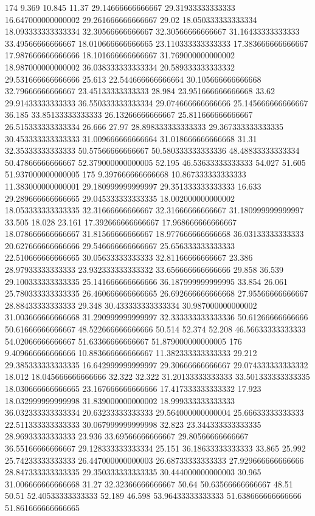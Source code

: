 174 9.369 10.845 11.37 29.14666666666667 29.31933333333333 16.647000000000002 29.261666666666667 29.02 18.050333333333334 18.093333333333334 32.30566666666667 32.30566666666667 31.16433333333333 33.49566666666667 18.010666666666665 23.110333333333333 17.383666666666667 17.987666666666666 18.101666666666667 31.769000000000002 18.987000000000002 36.038333333333334 20.589333333333332 29.531666666666666 25.613 22.544666666666664 30.105666666666668 32.79666666666667 23.45133333333333 28.984 23.951666666666668 33.62 29.91433333333333 36.550333333333334 29.074666666666666 25.145666666666667 36.185 33.85133333333333 26.13266666666667 25.811666666666667 26.515333333333334 26.666 27.97 28.898333333333333 29.367333333333335 30.453333333333333 31.009666666666664 31.018666666666668 31.31 32.35333333333333 50.57566666666667 50.580333333333336 48.48833333333334 50.47866666666667 52.379000000000005 52.195 46.53633333333333 54.027 51.605 51.937000000000005
175 9.397666666666668 10.867333333333333 11.383000000000001 29.180999999999997 29.351333333333333 16.633 29.289666666666665 29.045333333333335 18.002000000000002 18.053333333333335 32.31666666666667 32.31666666666667 31.180999999999997 33.505 18.028 23.161 17.392666666666667 17.968666666666667 18.078666666666667 31.81566666666667 18.977666666666668 36.03133333333333 20.627666666666666 29.546666666666667 25.656333333333333 22.510666666666665 30.05633333333333 32.81166666666667 23.386 28.97933333333333 23.932333333333332 33.656666666666666 29.858 36.539 29.100333333333335 25.141666666666666 36.187999999999995 33.854 26.061 25.780333333333335 26.460666666666665 26.692666666666668 27.95566666666667 28.88433333333333 29.348 30.433333333333334 30.987000000000002 31.003666666666668 31.290999999999997 32.333333333333336 50.61266666666666 50.61666666666667 48.522666666666666 50.514 52.374 52.208 46.56633333333333 54.02066666666667 51.63366666666667 51.879000000000005
176 9.409666666666666 10.883666666666667 11.382333333333333 29.212 29.385333333333335 16.642999999999997 29.30666666666667 29.074333333333332 18.012 18.045666666666666 32.322 32.322 31.20133333333333 33.501333333333335 18.030666666666665 23.167666666666666 17.417333333333332 17.923 18.032999999999998 31.839000000000002 18.999333333333333 36.032333333333334 20.63233333333333 29.564000000000004 25.66633333333333 22.511333333333333 30.067999999999998 32.823 23.344333333333335 28.96933333333333 23.936 33.69566666666667 29.80566666666667 36.55166666666667 29.128333333333334 25.151 36.18633333333333 33.865 25.992 25.74233333333333 26.447000000000003 26.68733333333333 27.929666666666666 28.847333333333335 29.350333333333335 30.444000000000003 30.965 31.006666666666668 31.27 32.32366666666667 50.64 50.63566666666667 48.51 50.51 52.40533333333333 52.189 46.598 53.96433333333333 51.638666666666666 51.861666666666665
